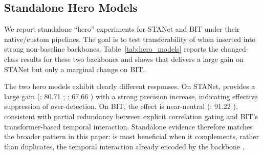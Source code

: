 \subsection{Standalone Hero Models}\label{sec:hero_models}
We report standalone ``hero'' experiments for STANet \cite{chen2020stanet} and BIT \cite{chen2022bit} under their native/custom pipelines. The goal is to test transferability of \cosa{} when inserted into strong non-baseline backbones.
Table~\ref{tab:hero_models} reports the changed-class results for these two backbones and shows that \cosa{} delivers a large gain on STANet but only a marginal change on BIT.



The two hero models exhibit clearly different responses. On STANet, \cosa{} provides a large gain (\Fonec{}: 80.71 ; \Iouc{}: 67.66 ) with a strong precision increase, indicating effective suppression of over-detection. On BIT, the effect is near-neutral (\Fonec{}: 91.22 ), consistent with partial redundancy between explicit correlation gating and BIT's transformer-based temporal interaction. Standalone evidence therefore matches the broader pattern in this paper: \cosa{} is most beneficial when it complements, rather than duplicates, the temporal interaction already encoded by the backbone \cite{w2022,wei2024}.
